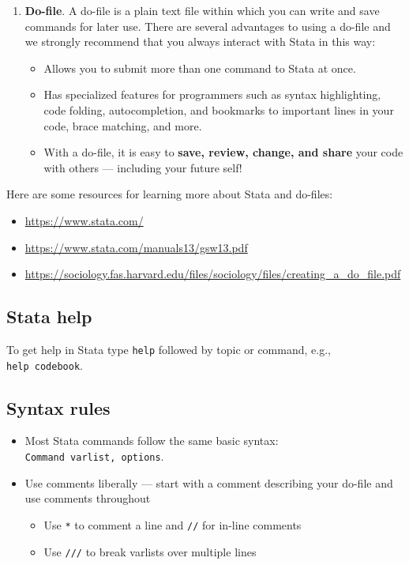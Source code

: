 \documentclass[
]{book}
\providecommand{\tightlist}{%
  \setlength{\itemsep}{0pt}\setlength{\parskip}{0pt}}
\begin{document}
\begin{enumerate}
\def\labelenumi{\arabic{enumi}.}
\setcounter{enumi}{2}
\tightlist
\item
  \textbf{Do-file}. A do-file is a plain text file within which you can write and save commands for later use. There are several advantages to using a do-file and we strongly recommend that you always interact with Stata in this way:

  \begin{itemize}
  \tightlist
  \item
    Allows you to submit more than one command to Stata at once.
  \item
    Has specialized features for programmers such as syntax highlighting, code folding, autocompletion, and bookmarks to important lines in your code, brace matching, and more.
  \item
    With a do-file, it is easy to \textbf{save, review, change, and share} your code with others --- including your future self!
  \end{itemize}
\end{enumerate}

Here are some resources for learning more about Stata and do-files:

\begin{itemize}
\tightlist
\item
  \url{https://www.stata.com/}
\item
  \url{https://www.stata.com/manuals13/gsw13.pdf}
\item
  \url{https://sociology.fas.harvard.edu/files/sociology/files/creating_a_do_file.pdf}
\end{itemize}

\hypertarget{stata-help}{%
\subsection{Stata help}\label{stata-help}}

To get help in Stata type \texttt{help} followed by topic or command, e.g., \texttt{help\ codebook}.

\hypertarget{syntax-rules-2}{%
\subsection{Syntax rules}\label{syntax-rules-2}}

\begin{itemize}
\item
  Most Stata commands follow the same basic syntax: \texttt{Command\ varlist,\ options}.
\item
  Use comments liberally --- start with a comment describing your do-file and use comments throughout

  \begin{itemize}
  \tightlist
  \item
    Use \texttt{*} to comment a line and \texttt{//} for in-line comments
  \item
    Use \texttt{///} to break varlists over multiple lines
  \end{itemize}
\end{itemize}
\end{document}
